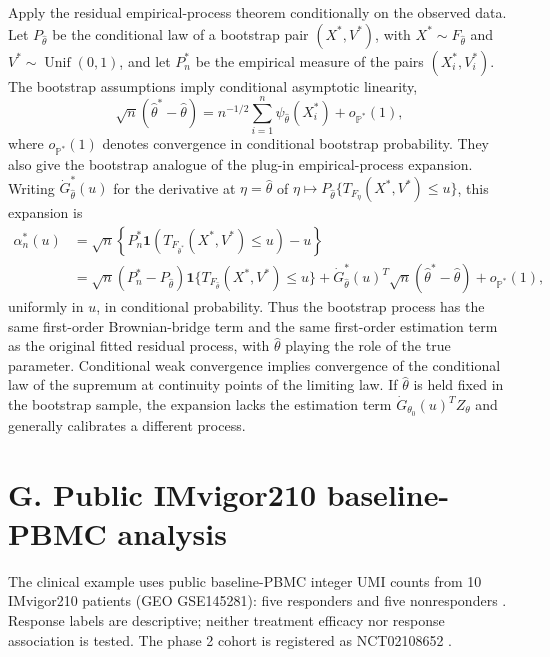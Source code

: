 \documentclass[12pt]{article}
\theoremstyle{remark}
\begin{document}
Apply the residual empirical-process theorem conditionally on the observed
data. Let $P_{\widehat\theta}$ be the conditional law of a bootstrap pair
$(X^*,V^*)$, with $X^*\sim F_{\widehat\theta}$ and
$V^*\sim\operatorname{Unif}(0,1)$, and let $P_n^*$ be the empirical measure of
the pairs $(X_i^*,V_i^*)$. The bootstrap assumptions imply conditional
asymptotic linearity,
\[
\sqrt n(\widehat\theta^*-\widehat\theta)
=n^{-1/2}\sum_{i=1}^n\psi_{\widehat\theta}(X_i^*)+o_{\mathbb P^*}(1),
\]
where $o_{\mathbb P^*}(1)$ denotes convergence in conditional bootstrap
probability. They also give the bootstrap analogue of the plug-in
empirical-process expansion. Writing $\dot G_{\widehat\theta}^*(u)$ for the
derivative at $\eta=\widehat\theta$ of
$\eta\mapsto P_{\widehat\theta}\{T_{F_\eta}(X^*,V^*)\le u\}$, this expansion is
\[
\begin{aligned}
\alpha_n^*(u)
&=\sqrt n\left\{P_n^*\mathbf 1(T_{F_{\widehat\theta^*}}(X^*,V^*)\le u)-u\right\}\\
&=\sqrt n(P_n^*-P_{\widehat\theta})
  \mathbf 1\{T_{F_{\widehat\theta}}(X^*,V^*)\le u\}
  +\dot G_{\widehat\theta}^*(u)^T
  \sqrt n(\widehat\theta^*-\widehat\theta)
  +o_{\mathbb P^*}(1),
\end{aligned}
\]
uniformly in $u$, in conditional probability. Thus the bootstrap process has
the same first-order Brownian-bridge term and the same first-order estimation
term as the original fitted residual process, with $\widehat\theta$ playing the
role of the true parameter. Conditional weak convergence implies convergence
of the conditional law of the supremum at continuity points of the limiting
law. If $\widehat\theta$ is held fixed in the bootstrap sample, the expansion
lacks the estimation term $\dot G_{\theta_0}(u)^T Z_\theta$ and generally
calibrates a different process.

\section*{G. Public IMvigor210 baseline-PBMC analysis}

The clinical example uses public baseline-PBMC integer UMI counts from 10
IMvigor210 patients (GEO GSE145281): five responders and five nonresponders
\cite{yuen2020il8}. Response labels are descriptive; neither treatment efficacy
nor response association is tested. The phase 2 cohort is registered as
NCT02108652 \cite{rosenberg2016atezolizumab}.
\end{document}
